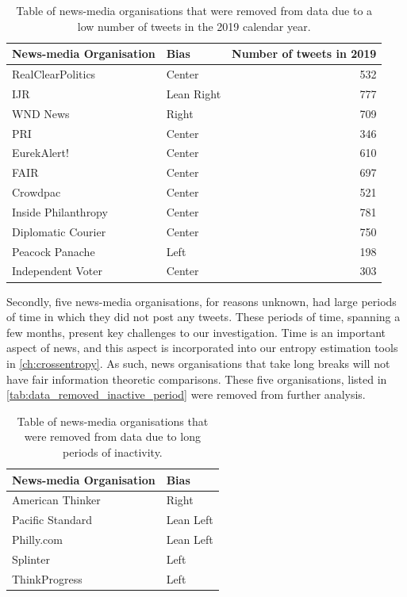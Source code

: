 \begin{table}[!htbp]
	\centering
	\begin{tabular}{llr}
		\toprule
		News-media Organisation &    Bias  &  Number of tweets in 2019\\
		\midrule
		RealClearPolitics &      Center &  532 \\
		IJR  &  Lean Right &  777 \\
		WND News &         Right &  709 \\
		PRI &                Center &  346 \\
		EurekAlert! &            Center &  610 \\
		FAIR &     Center &  697 \\
		Crowdpac &            Center &  521 \\
		Inside Philanthropy &        Center &  781 \\
		Diplomatic Courier &         Center &  750 \\
		Peacock Panache &          Left &  198 \\
		Independent Voter &            Center &  303 \\
		\bottomrule
	\end{tabular}
\caption{Table of news-media organisations that were removed from data due to a low number of tweets in the 2019 calendar year.}
\label{tab:data_removed_low_tweet_counts}
\end{table}

Secondly, five news-media organisations, for reasons unknown, had large periods of time in which they did not post any tweets. These periods of time, spanning a few months, present key challenges to our investigation. 
Time is an important aspect of news, and this aspect is incorporated into our entropy estimation tools in \autoref{ch:crossentropy}. As such, news organisations that take long breaks will not have fair information theoretic comparisons. These five organisations, listed in \autoref{tab:data_removed_inactive_period} were removed from further analysis.

\begin{table}[!htbp]
	\centering
	\begin{tabular}{ll}
		\toprule
		News-media Organisation &    Bias \\
		\midrule
		American Thinker  &      Right \\
		Pacific Standard &  Lean Left \\
		Philly.com  &  Lean Left \\
		Splinter &       Left \\
		ThinkProgress  &       Left \\
		\bottomrule
	\end{tabular}
	\caption{Table of news-media organisations that were removed from data due to long periods of inactivity.}
	\label{tab:data_removed_inactive_period}
\end{table}


